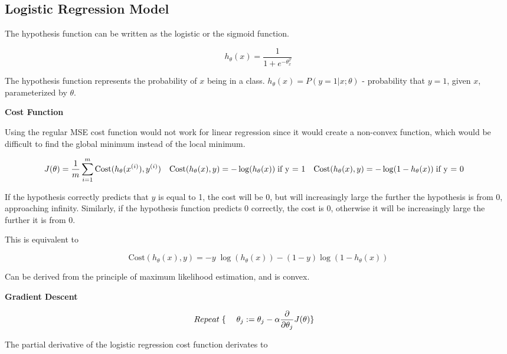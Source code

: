 \documentclass[
]{article}
\author{}
\date{}
\begin{document}
\hypertarget{header-n0}{%
\subsection{Logistic Regression Model}\label{header-n0}}

The hypothesis function can be written as the logistic or the sigmoid
function.

\[h_\theta(x) = \frac{1}{1 + e^{-\theta^T_x}}\]

The hypothesis function represents the probability of \(x\) being in a
class. \(h_\theta(x) = P(y=1|x;\theta)\) - probability that \(y=1\),
given \(x\), parameterized by \(\theta\).

\textbf{Cost Function}

Using the regular MSE cost function would not work for linear regression
since it would create a non-convex function, which would be difficult to
find the global minimum instead of the local minimum.

\begin{align*}& J(\theta) = \dfrac{1}{m} \sum_{i=1}^m \mathrm{Cost}(h_\theta(x^{(i)}),y^{(i)}) \newline & \mathrm{Cost}(h_\theta(x),y) = -\log(h_\theta(x)) \; & \text{if y = 1} \newline & \mathrm{Cost}(h_\theta(x),y) = -\log(1-h_\theta(x)) \; & \text{if y = 0}\end{align*}

If the hypothesis correctly predicts that \(y\) is equal to 1, the cost
will be 0, but will increasingly large the further the hypothesis is
from 0, approaching infinity. Similarly, if the hypothesis function
predicts 0 correctly, the cost is 0, otherwise it will be increasingly
large the further it is from 0.

This is equivalent to

\[\mathrm{Cost}(h_\theta(x),y) = - y \; \log(h_\theta(x)) - (1 - y) \log(1 - h_\theta(x))\]

Can be derived from the principle of maximum likelihood estimation, and
is convex.

\textbf{Gradient Descent}

\begin{align*}& Repeat \; \lbrace \newline & \; \theta_j := \theta_j - \alpha \dfrac{\partial}{\partial \theta_j}J(\theta) \newline & \rbrace\end{align*}

The partial derivative of the logistic regression cost function
derivates to
\end{document}
